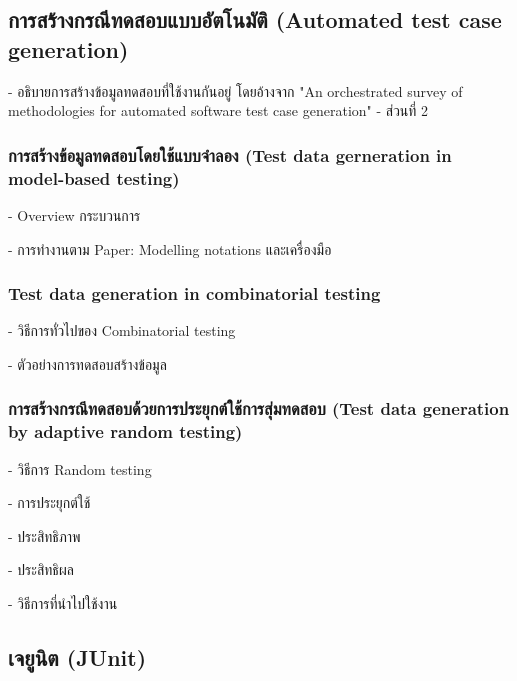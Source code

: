 \subsection{}


\subsection{การสร้างกรณีทดสอบแบบอัตโนมัติ (Automated test case generation)}
- อธิบายการสร้างข้อมูลทดสอบที่ใช้งานกันอยู่ โดยอ้างจาก "An orchestrated survey of methodologies for automated software test case generation" \cite{Anand2013} - ส่วนที่ 2

\subsubsection{การสร้างข้อมูลทดสอบโดยใช้แบบจำลอง (Test data gerneration in model-based testing)}
- Overview กระบวนการ

- การทำงานตาม Paper: Modelling notations และเครื่องมือ

\subsubsection{Test data generation in combinatorial testing}

- วิธีการทั่วไปของ Combinatorial testing 

- ตัวอย่างการทดสอบสร้างข้อมูล

\subsubsection{การสร้างกรณีทดสอบด้วยการประยุกต์ใช้การสุ่มทดสอบ (Test data generation by adaptive random testing)}

- วิธีการ Random testing 

- การประยุกต์ใช้

- ประสิทธิภาพ

- ประสิทธิผล

- วิธีการที่นำไปใช้งาน

\subsection{เจยูนิต (JUnit)}
